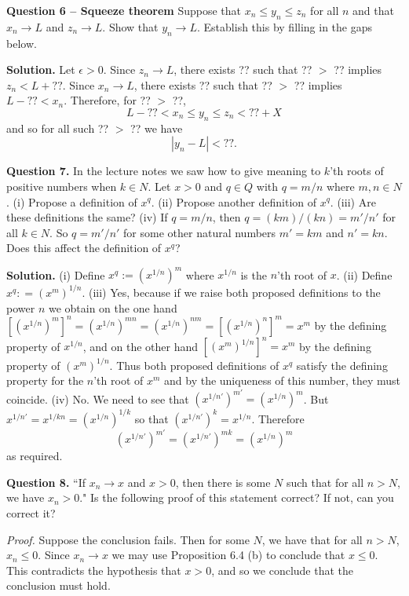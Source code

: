 \documentclass[12pt]{article}
\begin{document}
\bigskip
{\bf Question 6 -- Squeeze theorem} Suppose that $x_n \leq y_n \leq z_n$ for all $n$ and that $x_n \to L$ and $z_n \to L$. Show that $y_n \to L$. Establish this by filling in the gaps below.

{\bf Solution.} Let $\epsilon > 0$. Since $z_n \to L$, there exists ?? such that ?? $>$ ?? implies $ z_n < L + ??$. Since $x_n \to L$, there exists ?? such that ?? $>$ ?? implies $L- ?? < x_n$. Therefore, for ?? $ >$ ??, 
\[ L - ?? < x_n \leq y_n \leq z_n < ?? + X\]
and so for all such ?? $>$ ?? we have
\[ |y_n - L| < ??.\]

\bigskip
{\bf Question 7.} In the lecture notes we saw how to give meaning to $k$'th roots of positive numbers when $k \in {N}$. Let $x >0$ and $q \in {Q}$ with $q= m/n$ where $m, n \in N$. (i) Propose a definition of $x^q$. (ii) Propose another definition of $x^q$. (iii) Are these definitions the same? (iv) If $q = m/n$, then $q = (km)/(kn) = m'/n'$ for all $k \in N$. So $q = m'/n'$ for some other natural numbers $m'= km$ and $n'= kn$. Does this affect the definition of $x^q$?

{\bf Solution.} (i) Define $x^q := \left(x^{1/n}\right)^m$ where $x^{1/n}$ is the $n$'th root of $x$. (ii) Define $x^q: =  \left(x^m\right)^{1/n}$. (iii) Yes, because if we raise both proposed definitions to the power $n$ we obtain on the one hand $\left[\left(x^{1/n}\right)^m\right]^n
= \left(x^{1/n}\right)^{mn} = \left(x^{1/n}\right)^{nm} = \left[\left(x^{1/n}\right)^n\right]^m = x^m$ by the defining property of $x^{1/n}$, and on the other hand 
$\left[\left(x^m\right)^{1/n}\right]^n = x^m$ by the defining property of $(x^m)^{1/n}$. Thus both proposed definitions of $x^q$ satisfy the defining property for the $n$'th root of $x^m$ 
and by the uniqueness of this number, they must coincide. (iv) No. We need to see that $\left(x^{1/n'}\right)^{m'} = \left(x^{1/n}\right)^{m}$. But 
$x^{1/n'} = x^{1/kn} = \left(x^{1/n}\right)^{1/k}$ so that 
$\left(x^{1/n'}\right)^{k} = x^{1/n}$.
Therefore 
\[ \left(x^{1/n'}\right)^{m'} = 
\left(x^{1/n'}\right)^{mk} = \left(x^{1/n}\right)^m\]
as required.

\bigskip
{\bf Question 8.} ``If $x_n \to x$ and $x >0$, then there is some $N$ such that for all $n > N$, we have $x_n > 0$." Is the following proof of this statement correct? If not, can you correct it?

{\em Proof.} Suppose the conclusion fails. Then for some $N$, we have that for all $n >N$, $x_n \leq 0$. Since $x_n \to x$ we may use Proposition 6.4 (b) to conclude that $x \leq 0$. This contradicts the hypothesis that $x>0$, and so we conclude that the conclusion must hold.
\end{document}
